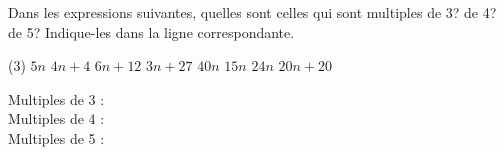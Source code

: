 %
%
Dans les expressions suivantes, quelles sont celles qui sont multiples de 3?  de 4? de 5? Indique-les dans la ligne correspondante.
    \begin{tasks} (3)
        \task $5n$
        \task $4n+4$
        \task $6n+12$
        \task $3n+27$
        \task $40n$
        \task $15n$
        \task $24n$
        \task $20n+20$
    \end{tasks}
    Multiples de 3 : \\

    Multiples de 4 : \\

    Multiples de 5 : \\

